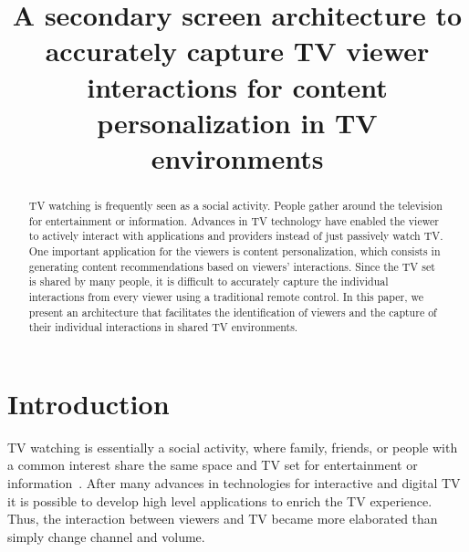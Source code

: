 \documentclass[conference,a4paper]{IEEEtran}
\begin{document}
\title{A secondary screen architecture to accurately capture TV viewer interactions for content personalization in TV environments}

\author{
\and
{}
}
\maketitle

\begin{abstract}
TV watching is frequently seen as a social activity. People gather around the television for entertainment or information. Advances in TV technology have enabled the viewer to actively interact with applications and providers instead of just passively watch TV. One important application for the viewers is content personalization, which consists in generating content recommendations based on viewers' interactions. Since the TV set is shared by many people, it is difficult to accurately capture the individual interactions from every viewer using a traditional remote control. In this paper, we present an architecture that facilitates the identification of viewers and the capture of their individual interactions in shared TV environments.
\end{abstract}

\IEEEpeerreviewmaketitle

\section{Introduction}

TV watching is essentially a social activity, where family, friends, or people with a common interest share the same space and TV set for entertainment or information~\cite{Masthoff2004}. After many advances in technologies for interactive and digital TV it is possible to develop high level applications to enrich the TV experience. Thus, the interaction between viewers and TV became more elaborated than simply change channel and volume.
\end{document}

